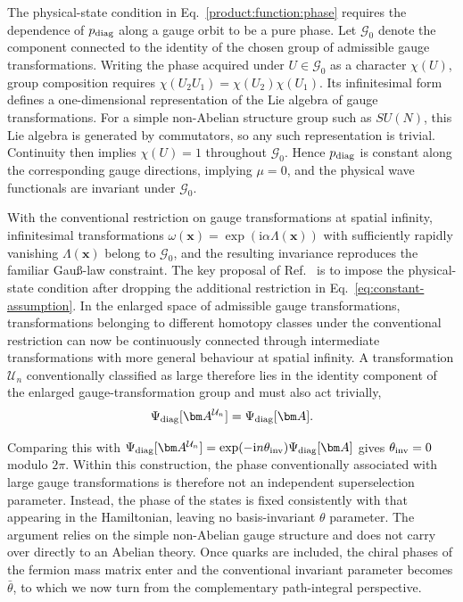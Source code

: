 \documentclass[review]{elsarticle}
\numberwithin{equation}{section}
\numberwithin{table}{section}
\numberwithin{figure}{section}
\def\i{\mathrm{i}}
\begin{document}
The physical-state condition in Eq.~\eqref{product:function:phase} requires the dependence of $p_{\rm diag}$ along a gauge orbit to be a pure phase. Let $\mathcal{G}_0$ denote the component connected to the identity of the chosen group of admissible gauge transformations. Writing the phase acquired under $U\in\mathcal{G}_0$ as a character $\chi(U)$, group composition requires $\chi(U_2U_1)=\chi(U_2)\chi(U_1)$. Its infinitesimal form defines a one-dimensional representation of the Lie algebra of gauge transformations. For a simple non-Abelian structure group such as $SU(N)$, this Lie algebra is generated by commutators, so any such representation is trivial. Continuity then implies $\chi(U)=1$ throughout $\mathcal{G}_0$. Hence $p_{\rm diag}$ is constant along the corresponding gauge directions, implying $\mu=0$, and the physical wave functionals are invariant under $\mathcal{G}_0$.

With the conventional restriction on gauge transformations at spatial infinity, infinitesimal transformations $\omega(\bm x)=\exp(\i\alpha\Lambda(\bm x))$ with sufficiently rapidly vanishing $\Lambda(\bm x)$ belong to $\mathcal{G}_0$, and the resulting invariance reproduces the familiar Gau{\ss}-law constraint. The key proposal of Ref.~\cite{Ai:2024vfa} is to impose the physical-state condition after dropping the additional restriction in Eq.~\eqref{eq:constant-assumption}. In the enlarged space of admissible gauge transformations, transformations belonging to different homotopy classes under the conventional restriction can now be continuously connected through intermediate transformations with more general behaviour at spatial infinity. A transformation $\mathcal U_n$ conventionally classified as large therefore lies in the identity component of the enlarged gauge-transformation group and must also act trivially,
\begin{align}
    \Psi_{\rm diag}[\bm A^{\mathcal U_n}]
    =
    \Psi_{\rm diag}[\bm A].
\end{align}

Comparing this with $\Psi_{\rm diag}[\bm A^{\mathcal U_n}]=\exp(-\i n\theta_{\rm inv})\Psi_{\rm diag}[\bm A]$ gives $\theta_{\rm inv}=0$ modulo $2\pi$. Within this construction, the phase conventionally associated with large gauge transformations is therefore not an independent superselection parameter. Instead, the phase of the states is fixed consistently with that appearing in the Hamiltonian, leaving no basis-invariant $\theta$ parameter. The argument relies on the simple non-Abelian gauge structure and does not carry over directly to an Abelian theory. Once quarks are included, the chiral phases of the fermion mass matrix enter and the conventional invariant parameter becomes $\bar\theta$, to which we now turn from the complementary path-integral perspective.
\end{document}
